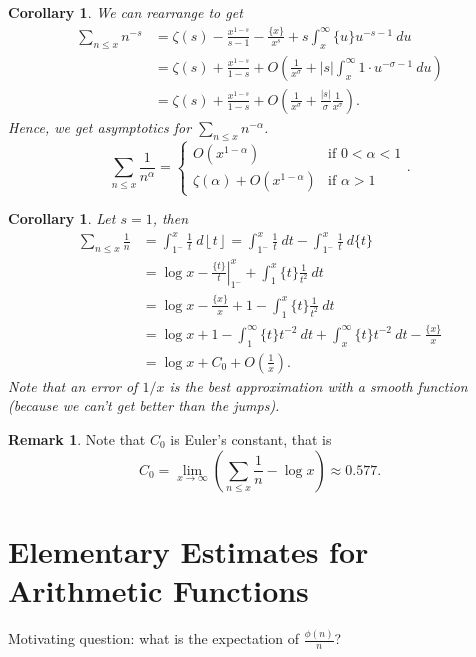 \documentclass[11pt]{article}
\newtheorem{cor}[thm]{Corollary}
\theoremstyle{definition}
\newtheorem{remark}[thm]{Remark}
\newcommand{\floor}[1]{\left\lfloor #1 \right\rfloor}
\newcommand{\s}[0]{\sigma}
\newcommand{\abs}[1]{\left\lvert#1\right\rvert} %
\begin{document}
\begin{cor}
We can rearrange to get
\begin{align*}
\sum_{n\le x}n^{-s}
&= \zeta(s) - \frac{x^{1-s}}{s-1} - \frac{\{x\}}{x^s} + s\int_x^\infty\{u\}u^{-s-1}~du \\
&= \zeta(s) + \frac{x^{1-s}}{1-s}
+ O\left(\frac1{x^\s}+\abs{s}\int_x^\infty1\cdot u^{-\s-1}~du\right) \\
&= \zeta(s) + \frac{x^{1-s}}{1-s}
+ O\left(\frac1{x^\s}+\frac{\abs{s}}\s\frac1{x^\s}\right) .
\end{align*}
Hence, we get asymptotics for $\sum_{n\le x}n^{-\alpha}$.
\[
\sum_{n\le x}\frac1{n^\alpha} = \begin{cases}
O(x^{1-\alpha}) &\text{if }0<\alpha<1 \\
\zeta(\alpha)+O(x^{1-\alpha}) &\text{if }\alpha>1
\end{cases} .
\]
\end{cor}

\begin{cor}
Let $s=1$, then
\begin{align*}
\sum_{n\le x}\frac1n &= \int_{1^-}^x\frac1t~d\floor{t}
= \int_{1^-}^x\frac1t~dt - \int_{1^-}^x\frac1t~d\{t\} \\
&= \log x - \left.\frac{\{t\}}t\right|_{1^-}^x + \int_1^x\{t\}\frac1{t^2}~dt \\
&= \log x - \frac{\{x\}}x + 1 - \int_1^x\{t\}\frac1{t^2}~dt \\
&= \log x + 1-\int_1^\infty\{t\}t^{-2}~dt + \int_x^\infty\{t\}t^{-2}~dt - \frac{\{x\}}x \\
&= \log x + C_0 + O\left(\frac1x\right) .
\end{align*}
Note that an error of $1/x$ is the best approximation with a smooth function (because we
can't get better than the jumps).
\end{cor}

\begin{remark}
Note that $C_0$ is Euler's constant, that is
\[
C_0 = \lim_{x\to\infty}\left(\sum_{n\le x}\frac1n - \log x\right) \approx 0.577 .
\]
\end{remark}


\section{Elementary Estimates for Arithmetic Functions}

Motivating question: what is the expectation of $\frac{\phi(n)}n$?
\end{document}
